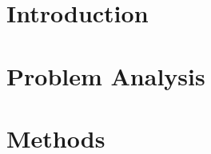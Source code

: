 \clearpage
			\tableofcontents
			\cleardoublepage


\fancyhf{}
\fancyfoot[C]{\thepage} %
\fancyhead[RE,LO]{}																												%
\fancyhead[RE,LO]{\color{aaublue}\small\nouppercase\leftmark} %
\pagestyle{fancy}



%
\chapter{Introduction} \label{chap:Introduction}



\chapter{Problem Analysis} \label{chap:PA}








%


\chapter{Methods} \label{chap:Methods}











